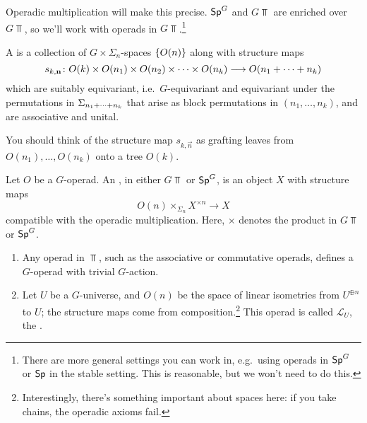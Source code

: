 Operadic multiplication will make this precise. $\mathsf{Sp}^G$ and $G\Top$ are enriched over $G\Top$, so we'll work with
operads in $G\Top$.\footnote{There are more general settings you can work in, e.g.\ using operads in $\mathsf{Sp}^G$ or
$\mathsf{Sp}$ in the stable setting. This is reasonable, but we won't need to do this.}
\begin{defn}
A  is a collection of $G\times\Sigma_n$-spaces $\{O(n)\}$ along with
structure maps
\[s_{k,\boldsymbol{\mathbf{n}}}\colon O(k)\times O(n_1)\times O(n_2)\times \dotsb \times O(n_k)\longrightarrow O(n_1+ \dotsb + n_k)\]
which are suitably equivariant, i.e.\ $G$-equivariant and equivariant under the permutations in $\Sigma_{n_1+ \dotsb +
n_k}$ that arise as block permutations in $(n_1,\dotsc,n_k)$, and are associative and unital.
\end{defn}
You should think of the structure map $s_{k,\vec n}$ as grafting leaves from $O(n_1),\dotsc,O(n_k)$ onto a tree
$O(k)$.
\begin{defn}
Let $O$ be a $G$-operad. An , in either $G\Top$ or $\mathsf{Sp}^G$, is an
object $X$ with structure maps
\[O(n)\times_{\Sigma_n} X^{\times n}\longrightarrow X\]
compatible with the operadic multiplication. Here, $\times$ denotes the product in $G\Top$ or $\mathsf{Sp}^G$.
\end{defn}
\begin{exm}\hfill
\label{Gopexm}
\begin{enumerate}
	\item Any operad in $\Top$, such as the associative or commutative operads, defines a $G$-operad with trivial
	$G$-action.
	\item Let $U$ be a $G$-universe, and $O(n)$ be the space of linear isometries from $U^{\oplus n}$ to $U$; the
	structure maps come from composition.\footnote{Interestingly, there's something important about spaces here: if
	you take chains, the operadic axioms fail.} This operad is called $\mathcal L_U$, the
	.
	\qedhere
\end{enumerate}
\end{exm}
